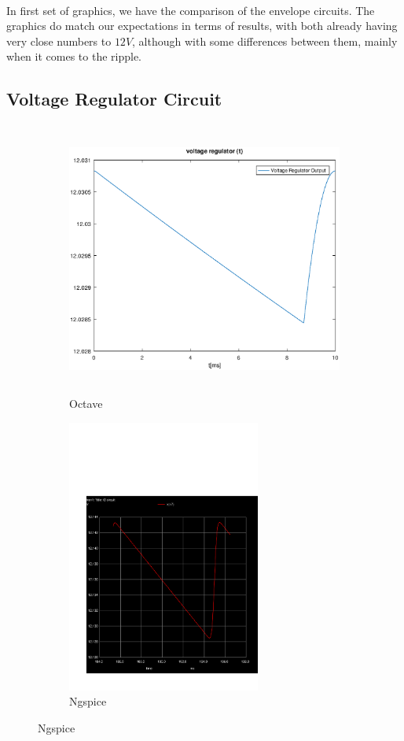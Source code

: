\paragraph{}
In first set of graphics, we have the comparison of the envelope circuits. The graphics do match our expectations in terms of results, with both already having very close numbers to $12V$, although with some differences between them, mainly when it comes to the ripple.


\subsection{Voltage Regulator Circuit}
\label{subsec:second_topic_error}
\begin{figure}[H]

\begin{subfigure}{0.5\textwidth}
\includegraphics[width=1.1\linewidth, height=9cm]{output.eps} 
\caption{Octave}
\label{fig:theosecondcompare}
\end{subfigure}
\begin{subfigure}{0.5\textwidth}
  \includegraphics[trim= 0cm 0cm 0cm 10cm, clip, width=1.1\linewidth, height=9cm]{trans2aux.pdf}
\caption{Ngspice}
\label{fig:simsecondcompare}
\end{subfigure}

\label{fig:compar2}
\end{figure}

